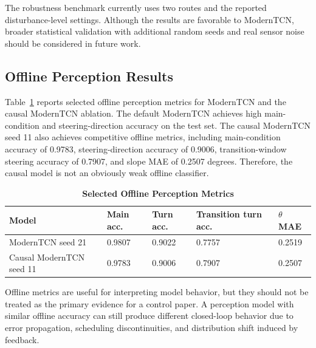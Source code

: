 \documentclass{ieeeaccess}
\begin{document}
The robustness benchmark currently uses two routes and the reported disturbance-level settings. Although the results are favorable to ModernTCN, broader statistical validation with additional random seeds and real sensor noise should be considered in future work.

\subsection{Offline Perception Results}

Table~\ref{tab:offline_metrics} reports selected offline perception metrics for ModernTCN and the causal ModernTCN ablation. The default ModernTCN achieves high main-condition and steering-direction accuracy on the test set. The causal ModernTCN seed 11 also achieves competitive offline metrics, including main-condition accuracy of 0.9783, steering-direction accuracy of 0.9006, transition-window steering accuracy of 0.7907, and slope MAE of 0.2507 degrees. Therefore, the causal model is not an obviously weak offline classifier.

\begin{table}[!t]

\caption{\textbf{Selected Offline Perception Metrics}}

\label{tab:offline_metrics}

\setlength{\tabcolsep}{3pt}

\begin{tabular}{|p{90pt}|p{47pt}|p{47pt}|p{47pt}|p{47pt}|}

\hline

Model & Main acc. & Turn acc. & Transition turn acc. & $\theta$ MAE \\

\hline

ModernTCN seed 21 & 0.9807 & 0.9022 & 0.7757 & 0.2519 \\

Causal ModernTCN seed 11 & 0.9783 & 0.9006 & 0.7907 & 0.2507 \\

\hline

\end{tabular}

\end{table}


Offline metrics are useful for interpreting model behavior, but they should not be treated as the primary evidence for a control paper. A perception model with similar offline accuracy can still produce different closed-loop behavior due to error propagation, scheduling discontinuities, and distribution shift induced by feedback.
\end{document}
